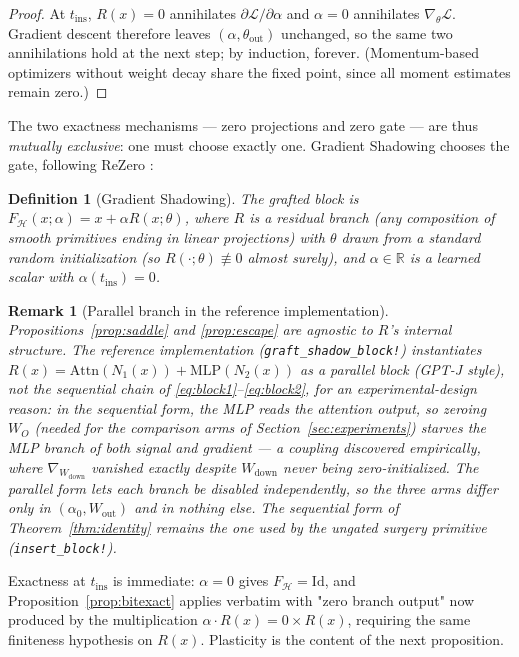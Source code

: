 \documentclass[11pt,a4paper]{article}
\newtheorem{definition}{Definition}
\newtheorem{remark}{Remark}
\newcommand{\Hb}{\mathcal{H}}
\newcommand{\Loss}{\mathcal{L}}
\begin{document}
\begin{proof}
At $t_{\mathrm{ins}}$, $R(x) = 0$ annihilates $\partial \Loss / \partial \alpha$ and $\alpha = 0$ annihilates $\nabla_\theta \Loss$. Gradient descent therefore leaves $(\alpha, \theta_{\mathrm{out}})$ unchanged, so the same two annihilations hold at the next step; by induction, forever. (Momentum-based optimizers without weight decay share the fixed point, since all moment estimates remain zero.)
\end{proof}

The two exactness mechanisms --- zero projections and zero gate --- are thus \emph{mutually exclusive}: one must choose exactly one. Gradient Shadowing chooses the gate, following ReZero \cite{rezero}:

\begin{definition}[Gradient Shadowing]
The grafted block is $F_{\Hb}(x; \alpha) = x + \alpha R(x; \theta)$, where $R$ is a residual branch (any composition of smooth primitives ending in linear projections) with $\theta$ drawn from a standard random initialization (so $R(\cdot;\theta) \not\equiv 0$ almost surely), and $\alpha \in \mathbb{R}$ is a learned scalar with $\alpha(t_{\mathrm{ins}}) = 0$.
\end{definition}

\begin{remark}[Parallel branch in the reference implementation]
\label{rem:parallel}
Propositions~\ref{prop:saddle} and \ref{prop:escape} are agnostic to $R$'s internal structure. The reference implementation (\texttt{graft\_shadow\_block!}) instantiates $R(x) = \mathrm{Attn}(N_1(x)) + \mathrm{MLP}(N_2(x))$ as a \emph{parallel} block (GPT-J style), not the sequential chain of \eqref{eq:block1}--\eqref{eq:block2}, for an experimental-design reason: in the sequential form, the MLP reads the attention output, so zeroing $W_O$ (needed for the comparison arms of Section~\ref{sec:experiments}) starves the MLP branch of both signal and gradient --- a coupling discovered empirically, where $\nabla_{W_{\mathrm{down}}}$ vanished exactly despite $W_{\mathrm{down}}$ never being zero-initialized. The parallel form lets each branch be disabled independently, so the three arms differ only in $(\alpha_0, W_{\mathrm{out}})$ and in nothing else. The sequential form of Theorem~\ref{thm:identity} remains the one used by the ungated surgery primitive (\texttt{insert\_block!}).
\end{remark}

Exactness at $t_{\mathrm{ins}}$ is immediate: $\alpha = 0$ gives $F_{\Hb} = \mathrm{Id}$, and Proposition~\ref{prop:bitexact} applies verbatim with "zero branch output" now produced by the multiplication $\alpha \cdot R(x) = 0 \times R(x)$, requiring the same finiteness hypothesis on $R(x)$. Plasticity is the content of the next proposition.
\end{document}
